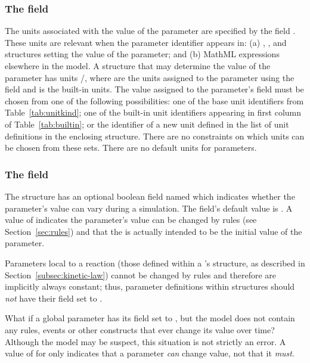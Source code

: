 \subsubsection{The  field}
\label{sec:parameter-units}

The units associated with the value of the parameter are specified
by the field .  These units are relevant when the
parameter identifier appears in: (a) \RateRule, \AssignmentRule,
\InitialAssignment and \EventAssignment structures setting the
value of the parameter; and (b) MathML expressions elsewhere in
the model. A \RateRule structure that may determine the value of
the parameter has units /, where  are the
units assigned to the parameter using the  field and
 is the built-in  units.  The value
assigned to the parameter's  field must be chosen
from one of the following possibilities: one of the base unit
identifiers from Table~\vref{tab:unitkind}; one of the built-in
unit identifiers appearing in first column of
Table~\vref{tab:builtin}; or the identifier of a new unit defined
in the list of unit definitions in the enclosing \Model structure.
There are no constraints on which units can be chosen from these
sets.  There are no default units for parameters.


\subsubsection{The  field}
\label{sec:parameter-constant}

The \Parameter structure has an optional boolean field named
 which indicates whether the parameter's value can
vary during a simulation.  The field's default value is
.  A value of  indicates the parameter's
value can be changed by rules (see Section~\ref{sec:rules}) and
that the  is actually intended to be the initial
value of the parameter.

Parameters local to a reaction (\ie those defined within a
\Reaction's \KineticLaw structure, as described in
Section~\ref{subsec:kinetic-law}) cannot be changed by rules and
therefore are implicitly always constant; thus, parameter
definitions within \Reaction structures should \emph{not} have
their  field set to .

What if a global parameter has its  field set to
, but the model does not contain any rules, events or
other constructs that ever change its value over time?  Although
the model may be suspect, this situation is not strictly an error.
A value of  for  only indicates that a
parameter \emph{can} change value, not that it \emph{must}.


